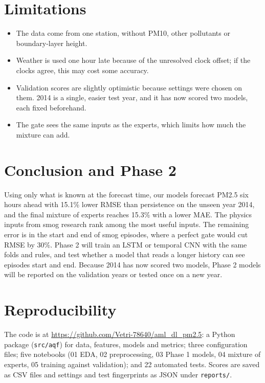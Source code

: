 \documentclass[conference]{IEEEtran}
\begin{document}
\section{Limitations}
\begin{itemize}
\item The data come from one station, without PM10, other pollutants or boundary-layer height.
\item Weather is used one hour late because of the unresolved clock offset; if the clocks agree, this may cost some accuracy.
\item Validation scores are slightly optimistic because settings were chosen on them. 2014 is a single, easier test year, and it has now scored two models, each fixed beforehand.
\item The gate sees the same inputs as the experts, which limits how much the mixture can add.
\end{itemize}

\section{Conclusion and Phase 2}
Using only what is known at the forecast time, our models forecast PM2.5 six hours ahead with 15.1\% lower RMSE than persistence on the unseen year 2014, and the final mixture of experts reaches 15.3\% with a lower MAE. The physics inputs from smog research rank among the most useful inputs. The remaining error is in the start and end of smog episodes, where a perfect gate would cut RMSE by 30\%. Phase 2 will train an LSTM or temporal CNN with the same folds and rules, and test whether a model that reads a longer history can see episodes start and end. Because 2014 has now scored two models, Phase 2 models will be reported on the validation years or tested once on a new year.

\section*{Reproducibility}
The code is at \url{https://github.com/Vetri-78640/aml_dl_pm2.5}: a Python package (\texttt{src/aqf}) for data, features, models and metrics; three configuration files; five notebooks (01 EDA, 02 preprocessing, 03 Phase 1 models, 04 mixture of experts, 05 training against validation); and 22 automated tests. Scores are saved as CSV files and settings and test fingerprints as JSON under \texttt{reports/}.
\end{document}

